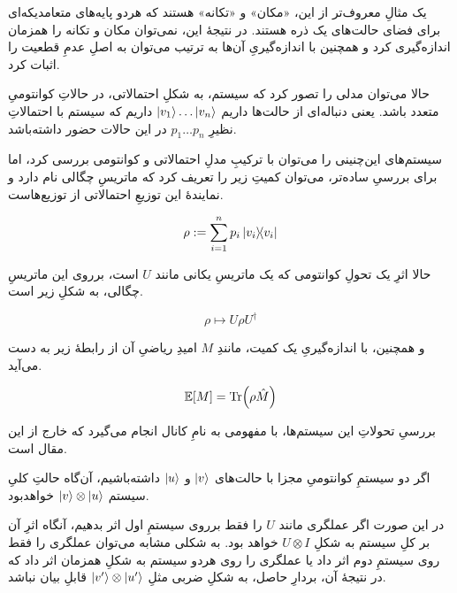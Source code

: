 یک مثالِ معروف‌تر از این، «مکان» و «تکانه» هستند که هردو پایه‌های متعامد‌یکه‌ای برای فضای حالت‌های یک ذره هستند. در نتیجهٔ این، نمی‌توان مکان و تکانه را همزمان اندازه‌گیری کرد و همچنین با اندازه‌گیریِ آن‌ها به ترتیب می‌توان به اصلِ عدمِ قطعیت 
را اثبات کرد.


حالا می‌توان مدلی را تصور کرد که سیستم، به شکلِ احتمالاتی، در حالاتِ کوانتومیِ متعدد باشد. یعنی دنباله‌ای از حالت‌ها داریم 
\(\ket{v_1}\dots \ket{v_n} \)
داریم که سیستم با احتمالاتِ نظیرِ
\( p_1 \dots p_n \)
در این حالات حضور داشته‌باشد.

سیستم‌های این‌چنینی را می‌توان با ترکیبِ مدلِ احتمالاتی و کوانتومی بررسی کرد، اما برای بررسیِ ساده‌تر، می‌توان کمیتِ زیر را تعریف کرد که ماتریسِ چگالی نام دارد و نمایندهٔ این توزیعِ احتمالاتی از توزیع‌هاست.

\begin{equation} \rho := \sum_{i=1}^n p_i \dyad{v_i} \end{equation}

حالا اثرِ یک تحولِ کوانتومی که یک ماتریسِ یکانی مانند \(U\) است، برروی این ماتریسِ چگالی، به شکلِ زیر است.

\begin{equation} \rho \mapsto U \rho U^\dagger \end{equation}

و همچنین، با اندازه‌گیریِ یک کمیت، مانندِ 
\(M\)
امیدِ ریاضیِ آن از رابطهٔ زیر به دست می‌آید.

\begin{equation}  \mathbb{E}[M] = \Tr(\rho \hat M)\end{equation}

بررسیِ تحولاتِ این سیستم‌ها، با مفهومی به نامِ کانال انجام می‌گیرد که خارج از این مقال است.


اگر دو سیستمِ کوانتومیِ مجزا با حالت‌های 
\(\ket{v}\)
و
\(\ket{u}\)
 داشته‌باشیم، آن‌گاه حالتِ کلیِ سیستم
\( \ket{v}\otimes\ket{u} \)
خواهدبود.

در این صورت اگر عملگری مانند \(U\) را فقط برروی سیستمِ اول اثر بدهیم، آنگاه اثرِ آن بر کلِ سیستم به شکلِ
\(U \otimes I\)
خواهد بود. به شکلی مشابه می‌توان عملگری را فقط روی سیستمِ دوم اثر داد یا عملگری را روی هردو سیستم به شکلِ همزمان اثر داد که در نتیجهٔ آن، بردارِ حاصل، به شکلِ ضربی مثلِ 
\( \ket{v'}\otimes\ket{u'} \)
قابلِ بیان نباشد.

